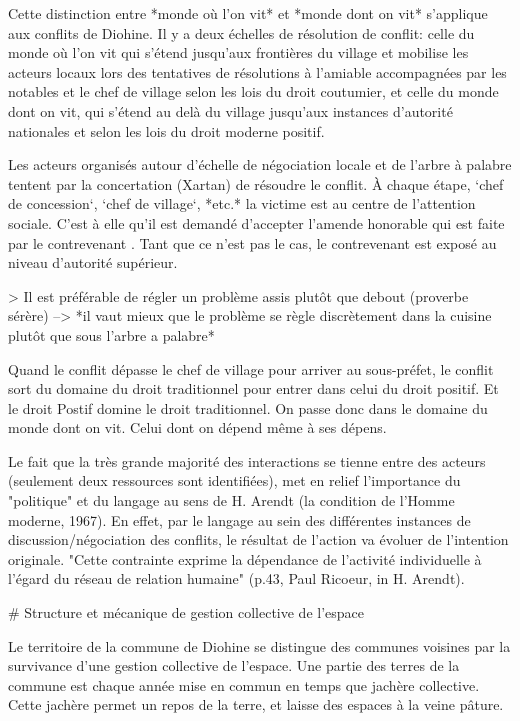 Cette distinction entre *monde où l'on vit* et *monde dont on vit* s'applique aux conflits de Diohine. Il y a deux échelles de résolution de conflit:  celle du monde où l'on vit qui s'étend jusqu'aux frontières du village et mobilise les acteurs locaux lors des tentatives de résolutions à l'amiable accompagnées par les notables et le chef de village selon les lois du droit coutumier,  et celle du monde dont on vit, qui s'étend au delà du village jusqu'aux instances d'autorité nationales et selon les lois du droit moderne positif. 

Les acteurs organisés autour d’échelle de négociation locale et de l'arbre à palabre tentent par la concertation (Xartan) de résoudre le conflit. À chaque étape, `chef de concession`, `chef de village`, *etc.* la victime est au centre de l'attention sociale. C'est à elle qu'il est demandé d'accepter l'amende honorable qui est faite par le contrevenant
. Tant que ce n'est pas le cas, le contrevenant est exposé au niveau d'autorité supérieur.

> Il est préférable de régler un problème assis plutôt que debout (proverbe sérère) --> *il vaut mieux que le problème se règle discrètement dans la cuisine plutôt que sous l'arbre a palabre*

Quand le conflit dépasse le chef de village pour arriver au sous-préfet, le conflit sort du domaine du droit traditionnel pour entrer dans celui du droit positif. Et le droit Postif domine le droit traditionnel. On passe donc dans le domaine du monde dont on vit. Celui dont on dépend même à ses dépens.

Le fait que la très grande majorité des interactions se tienne  entre des  acteurs (seulement deux ressources sont identifiées), met en relief l'importance du "politique" et du langage au sens de H. Arendt (la condition de l'Homme moderne, 1967). En effet, par le langage au sein des différentes instances de discussion/négociation des conflits, le résultat de l'action va évoluer de l'intention originale. "Cette contrainte exprime la dépendance de l'activité individuelle à l'égard du réseau de relation humaine" (p.43, Paul Ricoeur, in H. Arendt).

# Structure et mécanique de gestion collective de l'espace

Le territoire de la commune de Diohine se distingue des communes voisines par la survivance d'une gestion collective de l'espace. Une partie des terres de la commune est chaque année mise en commun en temps que jachère collective. Cette jachère permet un repos de la terre, et laisse des espaces à la veine pâture. 

